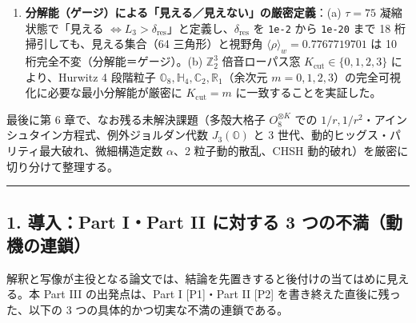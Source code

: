 \documentclass[
  a4paper,
]{ltjsarticle}
\begin{document}
\begin{enumerate}
{  \(\Delta D_{\mathrm{tidal}} = +0.028615\)} が明瞭に現れる。
\item
  \textbf{分解能（ゲージ）による「見える／見えない」の厳密定義}：(a)
  \(\tau = 75\) 凝縮状態で「見える
  \(\iff L_3 > \delta_{\mathrm{res}}\)」と定義し、\(\delta_{\mathrm{res}}\)
  を \texttt{1e-2} から \texttt{1e-20} まで 18
  桁掃引しても、見える集合（64 三角形）と視野角
  \(\langle\rho\rangle_w = 0.7767719701\) は 10
  桁完全不変（分解能＝ゲージ）。(b) \(\mathbb{Z}_2^3\) 倍音ローパス窓
  \(K_{\mathrm{cut}} \in \{0,1,2,3\}\) により、Hurwitz 4 段階粒子
  \(\mathbb{O}_8, \mathbb{H}_4, \mathbb{C}_2, \mathbb{R}_1\)（余次元
  \(m=0,1,2,3\)）の完全可視化に必要な最小分解能が厳密に
  \(K_{\mathrm{cut}} = m\) に一致することを実証した。
\end{enumerate}

最後に第 6 章で、なお残る未解決課題（多殻大格子 \(O_8^{\otimes K}\) での
\(1/r, 1/r^2\)・アインシュタイン方程式、例外ジョルダン代数
\(J_3(\mathbb{O})\) と 3
世代、動的ヒッグス・パリティ最大破れ、微細構造定数 \(\alpha\)、2
粒子動的散乱、CHSH 動的破れ）を厳密に切り分けて整理する。

\begin{center}\rule{0.5\linewidth}{0.5pt}\end{center}

\subsection{1. 導入：Part I・Part II に対する 3
つの不満（動機の連鎖）}\label{ux5c0eux5165part-ipart-ii-ux306bux5bfeux3059ux308b-3-ux3064ux306eux4e0dux6e80ux52d5ux6a5fux306eux9023ux9396}

解釈と写像が主役となる論文では、結論を先置きすると後付けの当てはめに見える。本
Part III の出発点は、Part I {[}P1{]}・Part II {[}P2{]}
を書き終えた直後に残った、以下の 3
つの具体的かつ切実な不満の連鎖である。
\end{document}
